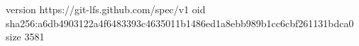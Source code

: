 version https://git-lfs.github.com/spec/v1
oid sha256:a6db4903122a4f6483393c4635011b1486ed1a8ebb989b1cc6cbf261131bdca0
size 3581
